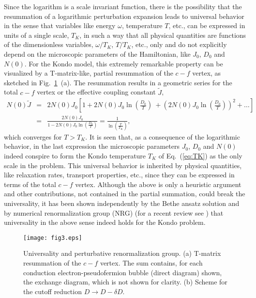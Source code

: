 \documentclass[12pt,twoside]{article}
\newcommand{\Eq}[1]{Eq.~(\ref{#1})}
\begin{document}
Since the logarithm is a scale invariant function, there is the 
possibility that the resummation of a logarithmic perturbation 
expansion leads to universal behavior in the sense that variables like 
energy $\omega$, temperature $T$, etc., can be expressed in units of a 
single scale, $T_K$, in such a way that all physical quantities 
are functions of the dimensionless variables, $\omega/T_K$, $T/T_K$, etc.,
only and do not explicitly depend on the microscopic parameters of the 
Hamiltonian, like $J_0$, $D_0$ and $N(0)$. 
For the Kondo model, this extremely remarkable property 
can be visualized by a T-matrix-like, partial resummation of the $c-f$ 
vertex, as sketched in Fig.~\ref{fig:RG}~(a). The resummation results 
in a geometric series for the total $c-f$ vertex or the effective
coupling constant $\tilde J$, 
\begin{eqnarray}
N(0)\tilde J  &=& 2N(0)J_0 
\left[ 1 + 2N(0)J_0 \ln\left(\frac{D_0}{T} \right) 
\ + \left( 2N(0)J_0 \ln\left(\frac{D_0}{T} \right) \right)^2 + \dots \right]\\ 
&=& \frac{2N(0)J_0}{1-2N(0)J_0 \ln\left(\frac{D_0}{T}\right)} =
\frac{1}{\ln\left(\frac{T}{T_K}\right)}, 
\end{eqnarray}
which converges for $T>T_K$. It is seen that, as a consequence of the
logarithmic behavior, in the last expression 
the microscopic parameters $J_0$, $D_0$ and $N(0)$ indeed
conspire to form the Kondo temperature $T_K$ of \Eq{eq:TK} as the only scale
in the problem. This universal behavior is inherited by physical quantities, 
like relaxation rates, transport properties, etc., since they can be expressed 
in terms of the total $c-f$ vertex.     
Although the above is only a heuristic argument and other contributions, 
not contained in the partial summation, could break the universality, it
has been shown independently by the Bethe ansatz solution 
\cite{Andrei83} and by numerical renormalization group (NRG) (for a recent
review see \cite{Bulla08}) that universality in the above sense indeed holds 
for the Kondo problem. 

\begin{figure}
\centering
\texttt{[image: fig3.eps]}
\caption{\label{fig:RG}
Universality and perturbative renormalization group. 
(a) T-matrix resummation of the $c-f$ vertex. The sum contains, for 
each conduction electron-pseudofermion bubble (direct diagram) shown, the
exchange diagram, which is not shown for clarity.
(b) Scheme for the cutoff reduction $D\to D-\delta D$. 
}
\end{figure}
\end{document}
